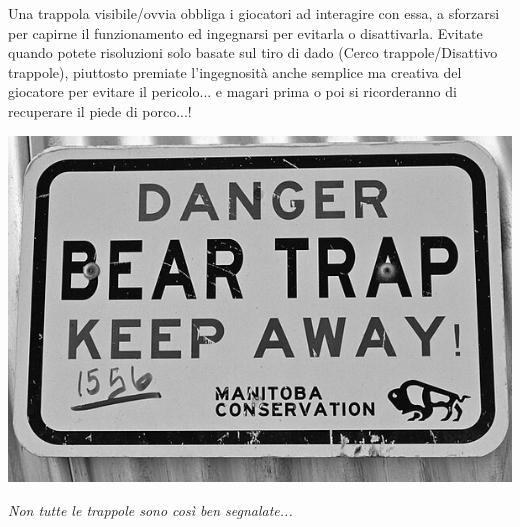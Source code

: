 \bigskip

\begin{changemargin}{0.3cm}{0.3cm}\begin{narratore}
Una trappola visibile/ovvia obbliga i giocatori ad interagire con essa, a sforzarsi per capirne il funzionamento ed ingegnarsi per evitarla o disattivarla. Evitate quando potete risoluzioni solo basate sul tiro di dado (Cerco trappole/Disattivo trappole), piuttosto premiate l'ingegnosità anche semplice ma creativa del giocatore per evitare il pericolo... e magari prima o poi si ricorderanno di recuperare il piede di porco...!
\end{narratore}\end{changemargin}

\vfill

\begin{center}
	\includegraphics[width=0.7\linewidth]{immagini/Bear_trap.png}

	\emph{Non tutte le trappole sono così ben segnalate...}
\end{center}

\pagebreak


